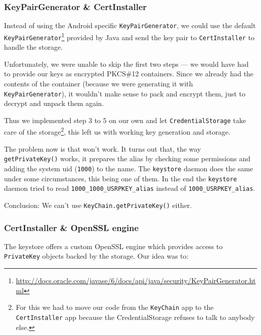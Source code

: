 \documentclass[a4paper,draft]{scrartcl}
\begin{document}
		\subsubsection{KeyPairGenerator \& CertInstaller}
			Instead of using the Android specific \texttt{KeyPairGenerator}, we could use the default \texttt{KeyPairGenerator}\footnote{\url{http://docs.oracle.com/javase/6/docs/api/java/security/KeyPairGenerator.html}} provided by Java and send the key pair to \texttt{CertInstaller} to handle the storage.

			Unfortunately, we were unable to skip the first two steps --- we would have had to provide our keys as encrypted PKCS\#12 containers. Since we already had the contents of the container (because we were generating it with \texttt{KeyPairGenerator}), it wouldn't make sense to pack and encrypt them, just to decrypt and unpack them again.

			Thus we implemented step 3 to 5 on our own and let \texttt{CredentialStorage} take care of the storage\footnote{For this we had to move our code from the \texttt{KeyChain} app to the \texttt{CertInstaller} app because the CredentialStorage refuses to talk to anybody else.}, this left us with working key generation and storage.

			The problem now is that  won't work. It turns out that, the way \texttt{getPrivateKey()} works, it prepares the alias by checking some permissions and adding the system uid (\texttt{1000}) to the name. The \texttt{keystore} daemon does the same under some circumstances, this being one of them. In the end the \texttt{keystore} daemon tried to read \texttt{1000\_1000\_USRPKEY\_alias} instead of \texttt{1000\_USRPKEY\_alias}.

			Conclusion: We can't use \texttt{KeyChain.getPrivateKey()} either.

		\subsubsection{CertInstaller \& OpenSSL engine}
			The keystore offers a custom OpenSSL engine which provides access to \texttt{PrivateKey} objects backed by the storage. Our idea was to:
\end{document}
